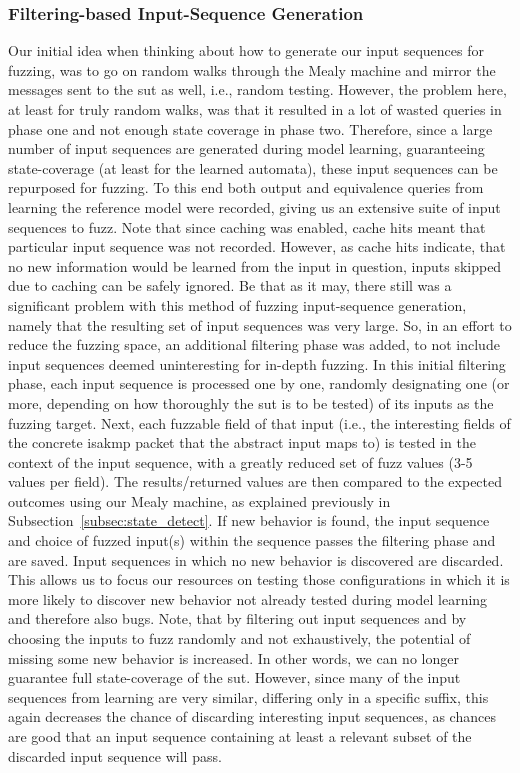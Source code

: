 \subsubsection{Filtering-based Input-Sequence Generation} \label{subsubsec:fuzz_filtering}
Our initial idea when thinking about how to generate our input sequences for fuzzing, was to go on random walks through the Mealy machine and mirror the messages sent to the \ac{sut} as well, i.e., random testing. However, the problem here, at least for truly random walks, was that it resulted in a lot of wasted queries in phase one and not enough state coverage in phase two. Therefore, since a large number of input sequences are generated during model learning, guaranteeing state-coverage (at least for the learned automata), these input sequences can be repurposed for fuzzing. To this end both output and equivalence queries from learning the reference model were recorded, giving us an extensive suite of input sequences to fuzz. Note that since caching was enabled, cache hits meant that particular input sequence was not recorded. However, as cache hits indicate, that no new information would be learned from the input in question, inputs skipped due to caching can be safely ignored. Be that as it may, there still was a significant problem with this method of fuzzing input-sequence generation, namely that the resulting set of input sequences was very large. So, in an effort to reduce the fuzzing space, an additional filtering phase was added, to not include input sequences deemed uninteresting for in-depth fuzzing. In this initial filtering phase, each input sequence is processed one by one, randomly designating one (or more, depending on how thoroughly the \ac{sut} is to be tested) of its inputs as the fuzzing target. Next, each fuzzable field of that input (i.e., the interesting fields of the concrete \ac{isakmp} packet that the abstract input maps to) is tested in the context of the input sequence, with a greatly reduced set of fuzz values (3-5 values per field). The results/returned values are then compared to the expected outcomes using our Mealy machine, as explained previously in Subsection~\ref{subsec:state_detect}. If new behavior is found, the input sequence and choice of fuzzed input(s) within the sequence passes the filtering phase and are saved. Input sequences in which no new behavior is discovered are discarded. This allows us to focus our resources on testing those configurations in which it is more likely to discover new behavior not already tested during model learning and therefore also bugs.
Note, that by filtering out input sequences and by choosing the inputs to fuzz randomly and not exhaustively, the potential of missing some new behavior is increased. In other words, we can no longer guarantee full state-coverage of the \ac{sut}. However, since many of the input sequences from learning are very similar, differing only in a specific suffix, this again decreases the chance of discarding interesting input sequences, as chances are good that an input sequence containing at least a relevant subset of the discarded input sequence will pass.

